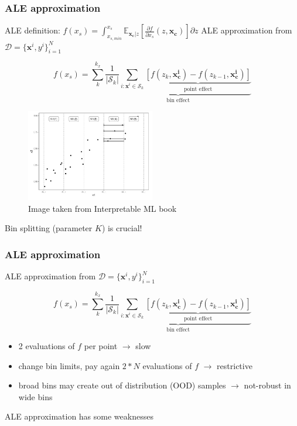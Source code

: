 \documentclass{beamer}
\newcommand{\xb}{\boldsymbol{x}}
\begin{document}
\begin{frame}
  \frametitle{ALE approximation}
  ALE definition: \( f(x_s) = \int_{x_{s, min}}^{x_s}\mathbb{E}_{\bm{x_c}|z}[ \frac{\partial f}{\partial x_s}(z, \bm{x_c})] \partial z \)
  \noindent\makebox[\linewidth]{\rule{\paperwidth}{0.4pt}}
  ALE approximation from \(\mathcal{D} = { \{\bm{x}^i, y^i}\}_{i=1}^N\)

    \[f(x_s) = \sum_k^{k_x} \underbrace{\frac{1}{|\mathcal{S}_k|} \sum_{i:\xb^i \in \mathcal{S}_k} \underbrace{[f(z_k, \bm{x^i_c}) - f(z_{k-1}, \bm{x^i_c})]}_{\text{point effect}}}_{\text{bin effect}} \]

  \begin{figure}[ht]
    \centering
    \includegraphics[width=0.5\textwidth]{./figures/ale_bins_iml.png}
    \caption{Image taken from Interpretable ML book~\citep{molnar2022}}
  \end{figure}

  \noindent\makebox[\linewidth]{\rule{\paperwidth}{0.4pt}}
  Bin splitting (parameter \(K\)) is crucial!
\end{frame}


\begin{frame}
  \frametitle{ALE approximation}
  ALE approximation from \(\mathcal{D} = { \{\bm{x}^i, y^i}\}_{i=1}^N\)

    \[f(x_s) = \sum_k^{k_x} \underbrace{\frac{1}{|\mathcal{S}_k|} \sum_{i:\xb^i \in \mathcal{S}_k} \underbrace{[f(z_k, \bm{x^i_c}) - f(z_{k-1}, \bm{x^i_c})]}_{\text{point effect}}}_{\text{bin effect}} \]

    \begin{itemize}
    \item 2 evaluations of \(f\) per point \( \rightarrow \) slow
    \item change bin limits, pay again \(2*N\) evaluations of \(f\) \( \rightarrow\) restrictive
    \item broad bins may create out of distribution (OOD) samples \( \rightarrow\) not-robust in wide bins
    \end{itemize}

  \noindent\makebox[\linewidth]{\rule{\paperwidth}{0.4pt}}
  ALE approximation has some weaknesses
\end{frame}
\end{document}
